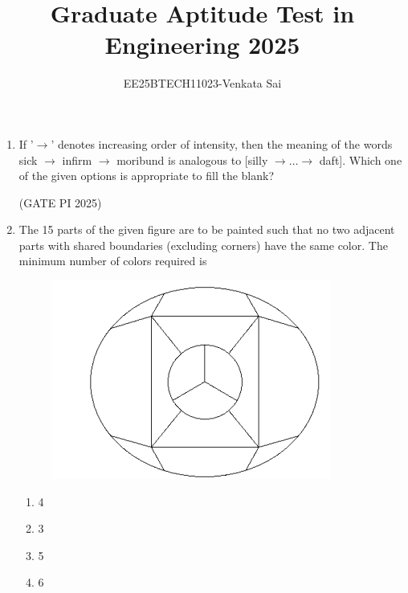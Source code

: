 \documentclass[journal,12pt,onecolumn]{IEEEtran}
\title{Graduate Aptitude Test in Engineering 2025}
\author{EE25BTECH11023-Venkata Sai}
\theoremstyle{remark}
\begin{document}
\noindent
\maketitle

\begin{enumerate}
\item If '$\rightarrow$' denotes increasing order of intensity, then the meaning of the words {sick $\rightarrow$ infirm $\rightarrow$ moribund} is analogous to [silly $\rightarrow \dots \rightarrow$ daft]. Which one of the given options is appropriate to fill the blank?
\begin{enumerate}
\end{enumerate}

\hfill (GATE PI 2025)

\item The 15 parts of the given figure are to be painted such that no two adjacent parts with shared boundaries (excluding corners) have the same color. The minimum number of colors required is

\begin{figure}[h]
    \centering
    \includegraphics[width=0.5\columnwidth]{figs/fig1.png}
    \caption{}
    \label{fig:placeholder}
\end{figure} 
\begin{multicols}{4}
\begin{enumerate}
    \item 4
    \item 3
    \item 5
    \item 6
\end{enumerate}
\end{multicols}


\end{enumerate}
\end{document}

